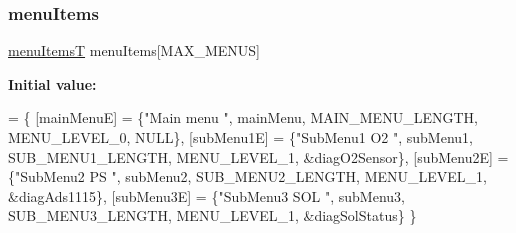 \subsubsection{\texorpdfstring{menu\+Items}{menuItems}}
{\footnotesize\ttfamily \hyperlink{structmenu_items_t}{menu\+ItemsT} menu\+Items\mbox{[}M\+A\+X\+\_\+\+M\+E\+N\+US\mbox{]}}

{\bfseries Initial value\+:}
\begin{DoxyCode}
= 
\{
  [mainMenuE] = \{\textcolor{stringliteral}{"Main menu "}, mainMenu, MAIN\_MENU\_LENGTH, MENU\_LEVEL\_0, NULL\},
  [subMenu1E] = \{\textcolor{stringliteral}{"SubMenu1 O2 "}, subMenu1, SUB\_MENU1\_LENGTH, MENU\_LEVEL\_1, &diagO2Sensor\},
  [subMenu2E] = \{\textcolor{stringliteral}{"SubMenu2 PS "}, subMenu2, SUB\_MENU2\_LENGTH, MENU\_LEVEL\_1, &diagAds1115\},  
  [subMenu3E] = \{\textcolor{stringliteral}{"SubMenu3 SOL "}, subMenu3, SUB\_MENU3\_LENGTH, MENU\_LEVEL\_1, &diagSolStatus\}
\}
\end{DoxyCode}
